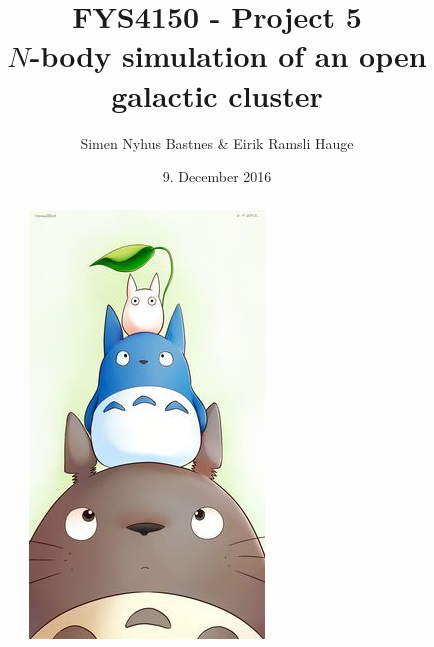 \documentclass{article}
\title{FYS4150 - Project 5\\$N$-body simulation of an open galactic cluster}
\author{Simen Nyhus Bastnes \& Eirik Ramsli Hauge}
\date{9. December 2016}
\begin{document}
\maketitle
\begin{abstract}
\begin{figure}[H]
\centering
\includegraphics[scale=0.5]{totoro.jpg}
\end{figure}
\end{abstract}
\end{document}
